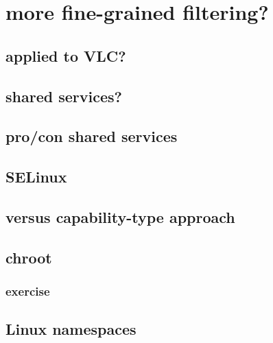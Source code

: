 \section{more fine-grained filtering?}



\subsection{applied to VLC?}


\subsection{shared services?}


\subsection{pro/con shared services}


\subsection{SELinux}


\subsection{versus capability-type approach}


\subsection{chroot}


\subsubsection{exercise}


\subsection{Linux namespaces}



